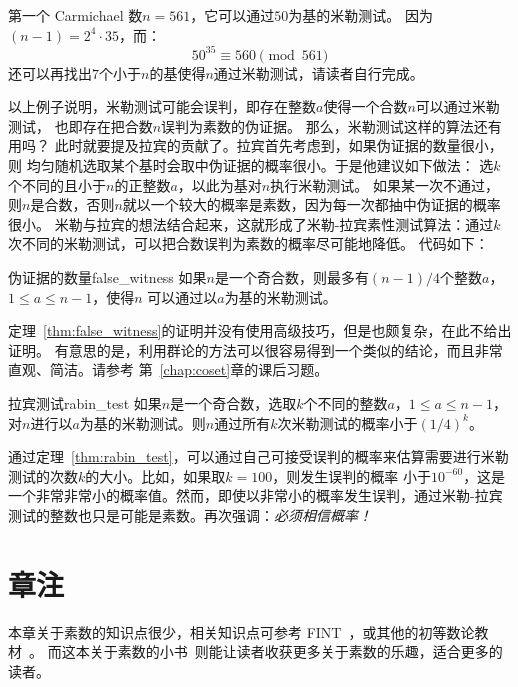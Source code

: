 \begin{example}
第一个 Carmichael 数$n = 561$，它可以通过$50$为基的米勒测试。
因为$(n - 1) = 2^{4} \cdot 35$，而：
\[ 50 ^ {35} \equiv 560 \pmod{561}\]
还可以再找出$7$个小于$n$的基使得$n$通过米勒测试，请读者自行完成。
\end{example}

以上例子说明，米勒测试可能会误判，即存在整数$a$使得一个合数$n$可以通过米勒测试，
也即存在把合数$n$误判为素数的伪证据。
那么，米勒测试这样的算法还有用吗？
此时就要提及拉宾的贡献了。拉宾首先考虑到，如果伪证据的数量很小，则
均匀随机选取某个基时会取中伪证据的概率很小。于是他建议如下做法：
选$k$个不同的且小于$n$的正整数$a$，以此为基对$n$执行米勒测试。
如果某一次不通过，则$n$是合数，否则$n$就以一个较大的概率是素数，因为每一次都抽中伪证据的概率很小。
米勒与拉宾的想法结合起来，这就形成了米勒-拉宾素性测试算法：通过$k$次不同的米勒测试，可以把合数误判为素数的概率尽可能地降低。
代码如下：
\begin{center}
\label{alg:miller_rabin}
	
\end{center}

\begin{theorem}{伪证据的数量}{false_witness}
	如果$n$是一个奇合数，则最多有$(n - 1)/4$个整数$a$，$1 \leq a \leq n-1$，使得$n$
	可以通过以$a$为基的米勒测试。 
\end{theorem}
定理~\ref{thm:false_witness}的证明并没有使用高级技巧，但是也颇复杂，在此不给出证明。
有意思的是，利用群论的方法可以很容易得到一个类似的结论，而且非常直观、简洁。请参考
第~\ref{chap:coset}章的课后习题。

\begin{theorem}{拉宾测试}{rabin_test}
如果$n$是一个奇合数，选取$k$个不同的整数$a$，$1 \leq a \leq n-1$，对$n$进行以$a$为基的米勒测试。则$n$通过所有$k$次米勒测试的概率小于$(1/4)^k$。
\end{theorem}
通过定理~\ref{thm:rabin_test}，可以通过自己可接受误判的概率来估算需要进行米勒测试的次数$k$的大小。比如，如果取$k =100$，则发生误判的概率
小于$10^{-60}$，这是一个非常非常小的概率值。然而，即使以非常小的概率发生误判，通过米勒-拉宾测试的整数也只是可能是素数。再次强调：\emph{必须相信概率！}

\section*{章注}
本章关于素数的知识点很少，相关知识点可参考 FINT~\cite{silverman2014friendly}，或其他的初等数论教材~\cite{Ros11ENTA,Bur11}。
而这本关于素数的小书~\cite{Rib04}则能让读者收获更多关于素数的乐趣，适合更多的读者。

